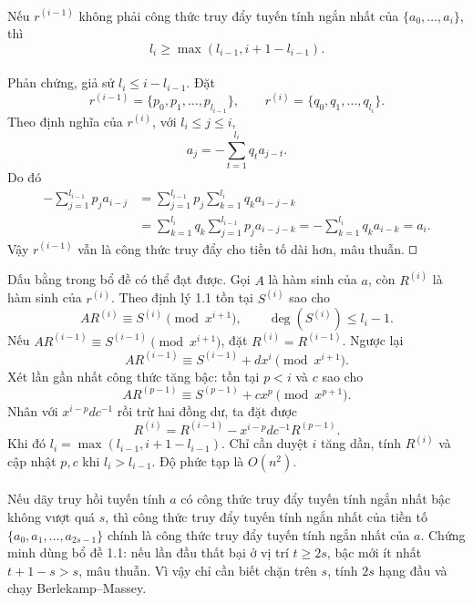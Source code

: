 \documentclass[11pt]{article}
\newcommand{\square}{\mathord{\vcenter{\hrule height .5pt
  \hbox{\vrule width .5pt height 5pt\kern5pt\vrule width .5pt}
  \hrule height .5pt}}}
\begin{document}
\paragraph{}
Nếu \(r^{(i-1)}\) không phải công thức truy đẩy tuyến tính ngắn nhất của
\(\{a_0,\ldots,a_i\}\), thì
\[
  l_i\ge \max(l_{i-1},i+1-l_{i-1}).
\]

\paragraph{}
Phản chứng, giả sử \(l_i\le i-l_{i-1}\). Đặt
\[
  r^{(i-1)}=\{p_0,p_1,\ldots,p_{l_{i-1}}\},\qquad
  r^{(i)}=\{q_0,q_1,\ldots,q_{l_i}\}.
\]
Theo định nghĩa của \(r^{(i)}\), với \(l_i\le j\le i\),
\[
  a_j=-\sum_{t=1}^{l_i}q_ta_{j-t}.
\]
Do đó
\[
\begin{aligned}
-\sum_{j=1}^{l_{i-1}}p_j a_{i-j}
&=\sum_{j=1}^{l_{i-1}}p_j\sum_{k=1}^{l_i}q_k a_{i-j-k}\\
&=\sum_{k=1}^{l_i}q_k\sum_{j=1}^{l_{i-1}}p_j a_{i-j-k}
=-\sum_{k=1}^{l_i}q_k a_{i-k}=a_i.
\end{aligned}
\]
Vậy \(r^{(i-1)}\) vẫn là công thức truy đẩy cho tiền tố dài hơn, mâu thuẫn.
\(\square\)

Dấu bằng trong bổ đề có thể đạt được. Gọi \(A\) là hàm sinh của \(a\), còn
\(R^{(i)}\) là hàm sinh của \(r^{(i)}\). Theo định lý 1.1 tồn tại \(S^{(i)}\)
sao cho
\[
  AR^{(i)}\equiv S^{(i)}\pmod{x^{i+1}},\qquad \deg(S^{(i)})\le l_i-1.
\]
Nếu \(AR^{(i-1)}\equiv S^{(i-1)}\pmod{x^{i+1}}\), đặt
\(R^{(i)}=R^{(i-1)}\). Ngược lại
\[
  AR^{(i-1)}\equiv S^{(i-1)}+dx^i\pmod{x^{i+1}}.
\]
Xét lần gần nhất công thức tăng bậc: tồn tại \(p<i\) và \(c\) sao cho
\[
  AR^{(p-1)}\equiv S^{(p-1)}+cx^p\pmod{x^{p+1}}.
\]
Nhân với \(x^{i-p}dc^{-1}\) rồi trừ hai đồng dư, ta đặt được
\[
  R^{(i)}=R^{(i-1)}-x^{i-p}dc^{-1}R^{(p-1)}.
\]
Khi đó \(l_i=\max(l_{i-1},i+1-l_{i-1})\). Chỉ cần duyệt \(i\) tăng dần, tính
\(R^{(i)}\) và cập nhật \(p,c\) khi \(l_i>l_{i-1}\). Độ phức tạp là
\(O(n^2)\).

\paragraph{}
Nếu dãy truy hồi tuyến tính \(a\) có công thức truy đẩy tuyến tính ngắn nhất
bậc không vượt quá \(s\), thì công thức truy đẩy tuyến tính ngắn nhất của tiền
tố \(\{a_0,a_1,\ldots,a_{2s-1}\}\) chính là công thức truy đẩy tuyến tính ngắn
nhất của \(a\). Chứng minh dùng bổ đề 1.1: nếu lần đầu thất bại ở vị trí
\(t\ge2s\), bậc mới ít nhất \(t+1-s>s\), mâu thuẫn. Vì vậy chỉ cần biết chặn
trên \(s\), tính \(2s\) hạng đầu và chạy Berlekamp--Massey.
\end{document}
